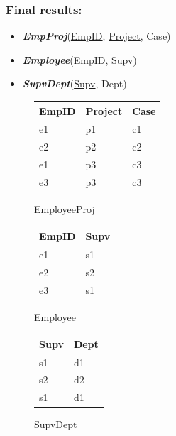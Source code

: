 \documentclass{report}
\begin{document}
\subsubsection*{Final results:}
\begin{itemize}
    \item \textit{\textbf{EmpProj}}(\underline{EmpID}, \underline{Project}, Case)
    \item \textit{\textbf{Employee}}(\underline{EmpID}, Supv)
    \item \textit{\textbf{SupvDept}}(\underline{Supv}, Dept)
\end{itemize}
\begin{figure}[H]
    \centering
    \begin{minipage}{0.3\textwidth}
        \centering
        \begin{tabular}{lll}
            \toprule
            EmpID & Project & Case \\
            \midrule
            e1 & p1 & c1 \\
            e2 & p2 & c2 \\
            e1 & p3 & c3 \\
            e3 & p3 & c3 \\
            \bottomrule
        \end{tabular}
        \caption*{EmployeeProj }
        \label{fig:emp_projects}
    \end{minipage}%
    \hfill
    \begin{minipage}{0.3\textwidth}
        \centering
         \setlength{\tabcolsep}{20}
        \begin{tabular}{ll}
            \toprule
            EmpID & Supv \\
            \midrule
            e1 & s1 \\
            e2 & s2 \\
            e3 & s1 \\
            \bottomrule
        \end{tabular}
        \caption*{Employee}
        \label{fig:emp_supv}
    \end{minipage}%
    \hfill
    \begin{minipage}{0.3\textwidth}
        \centering
         \setlength{\tabcolsep}{20}
        \begin{tabular}{ll}
            \toprule
            Supv & Dept \\
            \midrule
            s1 & d1 \\
            s2 & d2 \\
            s1 & d1 \\
            \bottomrule
        \end{tabular}
        \caption*{SupvDept}
        \label{fig:yourlabel}
    \end{minipage}
\end{figure}
\end{document}
